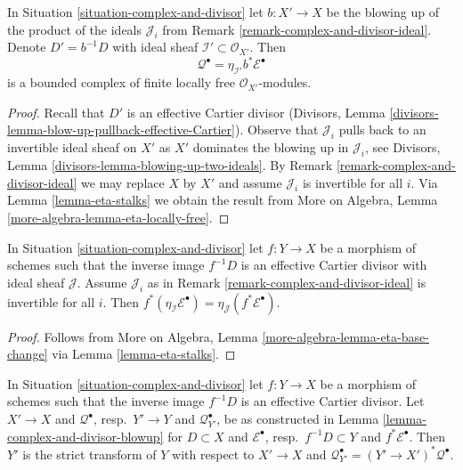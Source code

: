 \begin{lemma}
\label{lemma-complex-and-divisor-blowup}
In Situation \ref{situation-complex-and-divisor} let $b : X' \to X$
be the blowing up of the product of the ideals $\mathcal{J}_i$ from
Remark \ref{remark-complex-and-divisor-ideal}.
Denote $D' = b^{-1}D$ with ideal sheaf
$\mathcal{I}' \subset \mathcal{O}_{X'}$. Then
$$
\mathcal{Q}^\bullet =
\eta_{\mathcal{I}'}b^*\mathcal{E}^\bullet
$$
is a bounded complex of finite locally free $\mathcal{O}_{X'}$-modules.
\end{lemma}

\begin{proof}
Recall that $D'$ is an effective Cartier divisor
(Divisors, Lemma \ref{divisors-lemma-blow-up-pullback-effective-Cartier}).
Observe that $\mathcal{J}_i$ pulls back to an invertible ideal
sheaf on $X'$ as $X'$ dominates the blowing up in $\mathcal{J}_i$, see
Divisors, Lemma \ref{divisors-lemma-blowing-up-two-ideals}.
By Remark \ref{remark-complex-and-divisor-ideal} we may replace
$X$ by $X'$ and assume $\mathcal{J}_i$ is invertible for all $i$.
Via Lemma \ref{lemma-eta-stalks} we obtain the result from
More on Algebra, Lemma \ref{more-algebra-lemma-eta-locally-free}.
\end{proof}

\begin{lemma}
\label{lemma-complex-and-divisor-eta-pull}
In Situation \ref{situation-complex-and-divisor} let $f : Y \to X$
be a morphism of schemes such that the inverse image $f^{-1}D$
is an effective Cartier divisor with ideal sheaf $\mathcal{J}$.
Assume $\mathcal{J}_i$ as in Remark \ref{remark-complex-and-divisor-ideal}
is invertible for all $i$. Then $f^*(\eta_\mathcal{I}\mathcal{E}^\bullet) =
\eta_\mathcal{J}(f^*\mathcal{E}^\bullet)$.
\end{lemma}

\begin{proof}
Follows from
More on Algebra, Lemma \ref{more-algebra-lemma-eta-base-change}
via Lemma \ref{lemma-eta-stalks}.
\end{proof}

\begin{lemma}
\label{lemma-complex-and-divisor-blowup-base-change}
In Situation \ref{situation-complex-and-divisor} let $f : Y \to X$
be a morphism of schemes such that the inverse image $f^{-1}D$
is an effective Cartier divisor. Let $X' \to X$ and $\mathcal{Q}^\bullet$,
resp.\ $Y' \to Y$ and $\mathcal{Q}_{Y'}^\bullet$, be as constructed in
Lemma \ref{lemma-complex-and-divisor-blowup} for
$D \subset X$ and $\mathcal{E}^\bullet$,
resp.\ $f^{-1}D \subset Y$ and $f^*\mathcal{E}^\bullet$.
Then $Y'$ is the strict transform of $Y$ with respect to $X' \to X$
and $\mathcal{Q}_{Y'}^\bullet = (Y' \to X')^*\mathcal{Q}^\bullet$.
\end{lemma}

